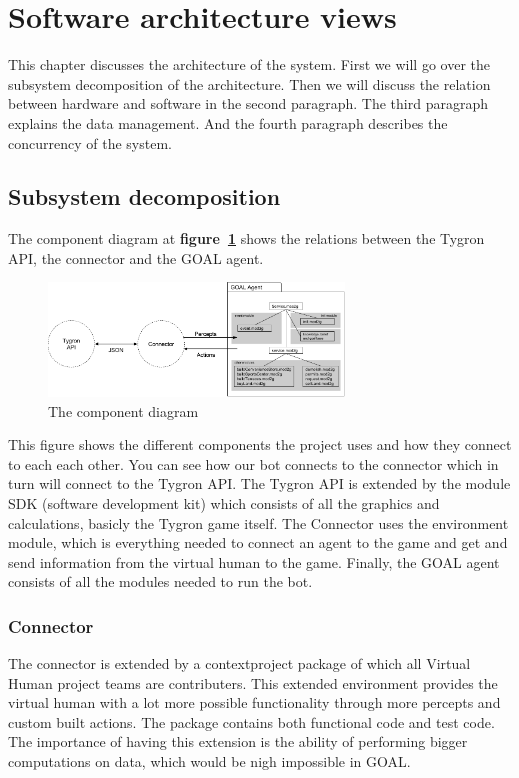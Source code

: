 \label{Software architecture views}
\section{Software architecture views}
This chapter discusses the architecture of the system. First we will go over the subsystem decomposition of the architecture. Then we will discuss the relation between hardware and software in the second paragraph. The third paragraph explains the data management. And the fourth paragraph describes the concurrency of the system.

\subsection{Subsystem decomposition}

The component diagram at \textbf{figure~\ref{fig:comp_diag}} shows the relations between the Tygron API, the connector and the GOAL agent. 

\begin{figure}[h]
	  \centering
	  \includegraphics[width=0.7\textwidth]{system_decomposition}
	  \caption{The component diagram}
	  \label{fig:comp_diag}
\end{figure}
This figure shows the different components the project uses and how they connect to each each other. You can see how our bot connects to the connector which in turn will connect to the Tygron API. The Tygron API is extended by the module SDK (software development kit) which consists of all the graphics and calculations, basicly the Tygron game itself. The Connector uses the environment module, which is everything needed to connect an agent to the game and get and send information from the virtual human to the game. Finally, the GOAL agent consists of all the modules needed to run the bot.

\subsubsection{Connector}
The connector is extended by a contextproject package of which all Virtual Human project teams are contributers. This extended environment provides the virtual human with a lot more possible functionality through more percepts and custom built actions. The package contains both functional code and test code. The importance of having this extension is the ability of performing bigger computations on data, which would be nigh impossible in GOAL.

